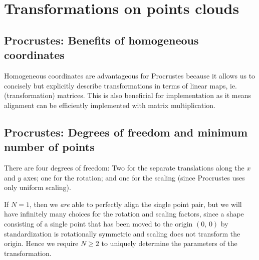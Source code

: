 \section{Transformations on points clouds}

\subsection{Procrustes: Benefits of homogeneous coordinates}

Homogeneous coordinates are advantageous for Procrustes because it allows us to
concisely but explicitly describe transformations in terms of linear maps, ie.
(transformation) matrices. This is also beneficial for implementation as it
means alignment can be efficiently implemented with matrix multiplication.

\subsection{Procrustes: Degrees of freedom and minimum number of points}

There are four degrees of freedom: Two for the separate translations along the
$x$ and $y$ axes; one for the rotation; and one for the scaling (since
Procrustes uses only uniform scaling).

If $N = 1$, then we \emph{are} able to perfectly align the single point pair,
but we will have infinitely many choices for the rotation and scaling factors,
since a shape consisting of a single point that has been moved to the origin
$(0,\, 0)$ by standardization is rotationally symmetric and scaling does not
transform the origin. Hence we require $N \geq 2$ to uniquely determine the
parameters of the transformation.

